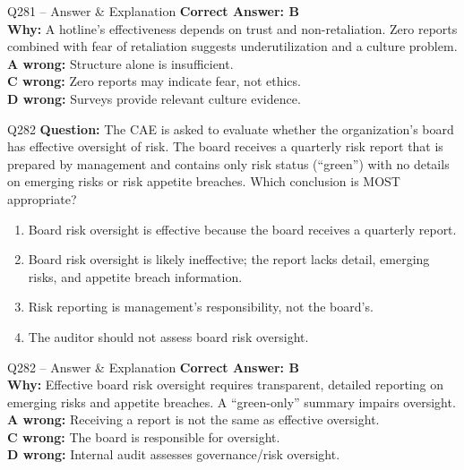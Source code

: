 \documentclass[aspectratio=169,10pt]{beamer}
\begin{document}
	\begin{frame}[t]{Q281 -- Answer \& Explanation}
		\small
		\textbf{Correct Answer: B} \\[4pt]
		\textbf{Why:} A hotline's effectiveness depends on trust and non-retaliation. Zero reports combined with fear of retaliation suggests underutilization and a culture problem. \\[4pt]
		\textbf{A wrong:} Structure alone is insufficient. \\[2pt]
		\textbf{C wrong:} Zero reports may indicate fear, not ethics. \\[2pt]
		\textbf{D wrong:} Surveys provide relevant culture evidence.
	\end{frame}
	
	\begin{frame}[t]{Q282}
		\small
		\textbf{Question:} The CAE is asked to evaluate whether the organization's board has effective oversight of risk. The board receives a quarterly risk report that is prepared by management and contains only risk status (``green'') with no details on emerging risks or risk appetite breaches. Which conclusion is MOST appropriate?
		\begin{enumerate}[label=\Alph*.,itemsep=1pt,topsep=2pt]
			\item Board risk oversight is effective because the board receives a quarterly report.
			\item Board risk oversight is likely ineffective; the report lacks detail, emerging risks, and appetite breach information.
			\item Risk reporting is management's responsibility, not the board's.
			\item The auditor should not assess board risk oversight.
		\end{enumerate}
	\end{frame}
	
	\begin{frame}[t]{Q282 -- Answer \& Explanation}
		\small
		\textbf{Correct Answer: B} \\[4pt]
		\textbf{Why:} Effective board risk oversight requires transparent, detailed reporting on emerging risks and appetite breaches. A ``green-only'' summary impairs oversight. \\[4pt]
		\textbf{A wrong:} Receiving a report is not the same as effective oversight. \\[2pt]
		\textbf{C wrong:} The board is responsible for oversight. \\[2pt]
		\textbf{D wrong:} Internal audit assesses governance/risk oversight.
	\end{frame}
	
\end{document}

